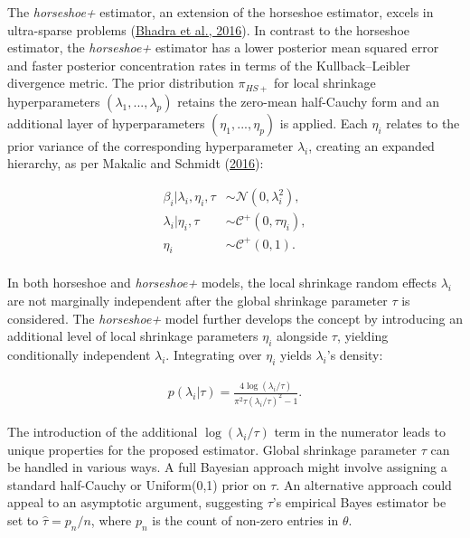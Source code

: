\documentclass[
  11pt,
]{article}
\begin{document}
The \emph{horseshoe+} estimator, an extension of the horseshoe
estimator, excels in ultra-sparse problems
(\protect\hyperlink{ref-Bhadra2016}{Bhadra et al., 2016}). In contrast
to the horseshoe estimator, the \emph{horseshoe+} estimator has a lower
posterior mean squared error and faster posterior concentration rates in
terms of the Kullback--Leibler divergence metric. The prior distribution
\(\pi_{HS+}\) for local shrinkage hyperparameters
\((\lambda_1, . . . , \lambda_p)\) retains the zero-mean half-Cauchy
form and an additional layer of hyperparameters
\((\eta_1, . . . , \eta_p)\) is applied. Each \(\eta_i\) relates to the
prior variance of the corresponding hyperparameter \(\lambda_i\),
creating an expanded hierarchy, as per Makalic and Schmidt
(\protect\hyperlink{ref-Makalic2016}{2016}):

\begin{equation}
\begin{aligned}
\beta_i | \lambda_i, \eta_i, \tau &\sim \mathcal{N}(0, \lambda_i^2), \\
\lambda_i | \eta_i, \tau &\sim \mathcal{C}^+(0, \tau \eta_i), \\
\eta_i &\sim \mathcal{C}^+(0,1). \\
\end{aligned}
\end{equation}

In both horseshoe and \emph{horseshoe+} models, the local shrinkage
random effects \(\lambda_i\) are not marginally independent after the
global shrinkage parameter \(\tau\) is considered. The \emph{horseshoe+}
model further develops the concept by introducing an additional level of
local shrinkage parameters \(\eta_i\) alongside \(\tau\), yielding
conditionally independent \(\lambda_i\). Integrating over \(\eta_i\)
yields \(\lambda_i\)'s density:

\begin{equation}
\begin{aligned}
p(\lambda_i|\tau) = \frac{4 \log(\lambda_i/\tau)}{\pi^2\tau(\lambda_i/\tau)^2 -1}.
\end{aligned}
\end{equation}

The introduction of the additional \(\log(\lambda_i/\tau)\) term in the
numerator leads to unique properties for the proposed estimator. Global
shrinkage parameter \(\tau\) can be handled in various ways. A full
Bayesian approach might involve assigning a standard half-Cauchy or
Uniform(0,1) prior on \(\tau\). An alternative approach could appeal to
an asymptotic argument, suggesting \(\tau\)'s empirical Bayes estimator
be set to \(\hat{\tau} = p_n/n\), where \(p_n\) is the count of non-zero
entries in \(\theta\).
\end{document}
